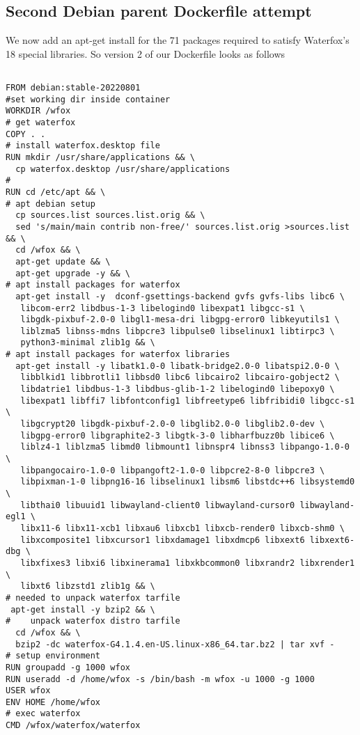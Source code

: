 \documentclass{article}  %
\begin{document}
\subsection{Second Debian parent Dockerfile attempt}
We now add an apt-get install for the 71 packages required to satisfy Waterfox's 18 special libraries. So version 2 of our Dockerfile looks as follows
\begin{verbatim}

FROM debian:stable-20220801
#set working dir inside container
WORKDIR /wfox
# get waterfox
COPY . .
# install waterfox.desktop file
RUN mkdir /usr/share/applications && \
  cp waterfox.desktop /usr/share/applications
#
RUN cd /etc/apt && \
# apt debian setup
  cp sources.list sources.list.orig && \
  sed 's/main/main contrib non-free/' sources.list.orig >sources.list && \
  cd /wfox && \
  apt-get update && \
  apt-get upgrade -y && \
# apt install packages for waterfox
  apt-get install -y  dconf-gsettings-backend gvfs gvfs-libs libc6 \
   libcom-err2 libdbus-1-3 libelogind0 libexpat1 libgcc-s1 \
   libgdk-pixbuf-2.0-0 libgl1-mesa-dri libgpg-error0 libkeyutils1 \
   liblzma5 libnss-mdns libpcre3 libpulse0 libselinux1 libtirpc3 \
   python3-minimal zlib1g && \
# apt install packages for waterfox libraries
  apt-get install -y libatk1.0-0 libatk-bridge2.0-0 libatspi2.0-0 \
   libblkid1 libbrotli1 libbsd0 libc6 libcairo2 libcairo-gobject2 \
   libdatrie1 libdbus-1-3 libdbus-glib-1-2 libelogind0 libepoxy0 \
   libexpat1 libffi7 libfontconfig1 libfreetype6 libfribidi0 libgcc-s1 \
   libgcrypt20 libgdk-pixbuf-2.0-0 libglib2.0-0 libglib2.0-dev \ 
   libgpg-error0 libgraphite2-3 libgtk-3-0 libharfbuzz0b libice6 \
   liblz4-1 liblzma5 libmd0 libmount1 libnspr4 libnss3 libpango-1.0-0 \
   libpangocairo-1.0-0 libpangoft2-1.0-0 libpcre2-8-0 libpcre3 \
   libpixman-1-0 libpng16-16 libselinux1 libsm6 libstdc++6 libsystemd0 \
   libthai0 libuuid1 libwayland-client0 libwayland-cursor0 libwayland-egl1 \
   libx11-6 libx11-xcb1 libxau6 libxcb1 libxcb-render0 libxcb-shm0 \
   libxcomposite1 libxcursor1 libxdamage1 libxdmcp6 libxext6 libxext6-dbg \
   libxfixes3 libxi6 libxinerama1 libxkbcommon0 libxrandr2 libxrender1 \
   libxt6 libzstd1 zlib1g && \
# needed to unpack waterfox tarfile
 apt-get install -y bzip2 && \
#    unpack waterfox distro tarfile
  cd /wfox && \
  bzip2 -dc waterfox-G4.1.4.en-US.linux-x86_64.tar.bz2 | tar xvf -
# setup environment
RUN groupadd -g 1000 wfox
RUN useradd -d /home/wfox -s /bin/bash -m wfox -u 1000 -g 1000
USER wfox
ENV HOME /home/wfox
# exec waterfox
CMD /wfox/waterfox/waterfox
\end{verbatim}
\end{document}
